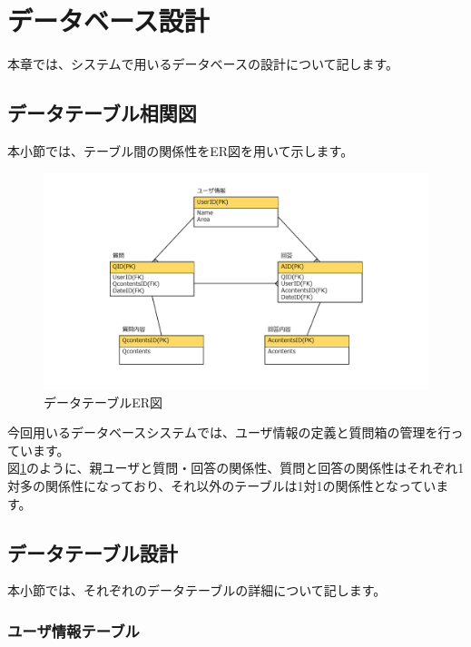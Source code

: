 \documentclass[a4j]{jarticle}
\begin{document}
\newpage

\section{データベース設計}
本章では、システムで用いるデータベースの設計について記します。
\subsection{データテーブル相関図}
本小節では、テーブル間の関係性をER図を用いて示します。
\begin{figure}[H]
  \begin{center} %
    \includegraphics[width=16.0cm]{ER図v2.png}
    \caption{データテーブルER図} %
    \label{fig:er} %
  \end{center}
\end{figure}

今回用いるデータベースシステムでは、ユーザ情報の定義と質問箱の管理を行っています。\\
図\ref{fig:er}のように、親ユーザと質問・回答の関係性、質問と回答の関係性はそれぞれ1対多の関係性になっており、それ以外のテーブルは1対1の関係性となっています。

\subsection{データテーブル設計}
本小節では、それぞれのデータテーブルの詳細について記します。

\subsubsection{ユーザ情報テーブル}
\end{document}
